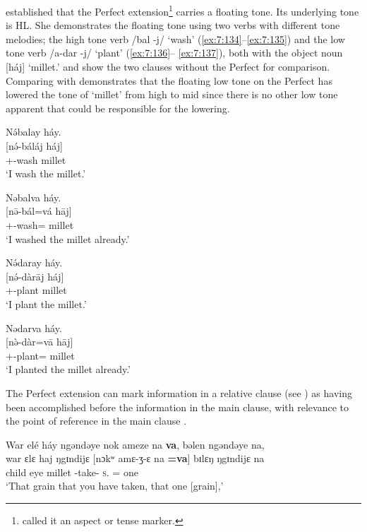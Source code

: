 \citet{Bow1997c} established that the Perfect extension\footnote{\citet{Bow1997c} called it an aspect or tense marker.} carries a floating tone. Its underlying tone is HL. She demonstrates the floating tone using two verbs with different tone melodies; the high tone verb /bal {}-j/ ‘wash’ (\ref{ex:7:134}--\ref{ex:7:135}) and the low tone verb /a-dar {}-j/ ‘plant’ (\ref{ex:7:136}-- \ref{ex:7:137}), both with the object noun [háj] ‘millet.’  and   show the two clauses without the Perfect for comparison. Comparing  with   demonstrates that the floating low tone on the Perfect has lowered the tone of ‘millet’ from high to mid since there is no other low tone apparent that could be responsible for the lowering.  

\ea\label{ex:7:134}
N\'əbalay  háy.\\
\gll  {}[n\'ə-báláj   háj]\\
      {\oneS}+{\IFV}-wash  millet\\
\glt  ‘I wash the millet.’\\
\z 

\ea\label{ex:7:135}
Nəbalva  háy.\\
\gll  {}[n\=ə-bál=vá     h\={a}j]\\
      {\oneS}+{\PFV}-wash={\PRF}  millet\\
\glt  ‘I washed the millet already.’\\
\z 

\ea\label{ex:7:136}
 N\'ədaray  háy.\\
\gll  {}[n\'ə-dàr\={a}j     háj]\\
      {\oneS}+{\IFV}-plant  millet\\
\glt  ‘I plant the millet.’\\
\z 

\ea\label{ex:7:137}
Nədarva  háy.\\
\gll  {}[n\`ə-dàr=v\={a}     h\={a}j]\\
      {\oneS}+{\PFV}-plant={\PRF}  millet\\
\glt  ‘I planted the millet already.’\\
\z 

The Perfect extension can mark information in a relative clause (see ) as having been accomplished before the information in the main clause, with relevance to the point of reference in the main clause . 

\ea\label{ex:7:138}
War  elé  háy  ngəndəye  nok ameze  na  \textbf{va},  bəlen  ngəndəye  na,\\ 
\gll  war     ɛlɛ  haj      ŋgɪndijɛ   [nɔkʷ  amɛ-ʒ{}-ɛ na \textbf{=va}]  bɪlɛŋ  ŋgɪndijɛ na\\ 
      child  eye  millet {\DEM}  {\twoS}  {\DEP}-take-{\CL}   \textsc{s}.{\DO}      ={\PRF} one {\DEM} {\PSP}\\ 
\glt ‘That grain that you have taken, that one [grain],’
      
